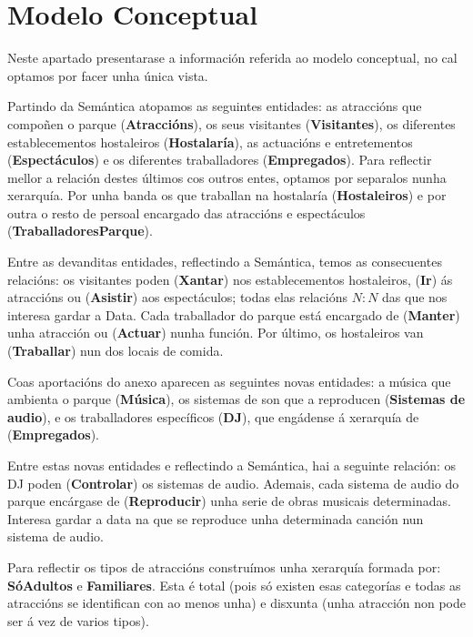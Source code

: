 \documentclass[12pt,a4paper]{book}
\theoremstyle{definition}
\theoremstyle{break}
\begin{document}
	
	
	\chapter{Modelo Conceptual}
	Neste apartado presentarase a información referida ao modelo conceptual, no cal optamos por facer unha única vista.
	
	Partindo da Semántica atopamos as seguintes entidades: as atraccións que compoñen o parque (\textbf{Atraccións}), os seus visitantes (\textbf{Visitantes}), os diferentes establecementos hostaleiros (\textbf{Hostalaría}), as actuacións e entretementos (\textbf{Espectáculos}) e os diferentes traballadores (\textbf{Empregados}). Para reflectir mellor a relación destes últimos cos outros entes, optamos por separalos nunha xerarquía. Por unha banda os que traballan na hostalaría (\textbf{Hostaleiros}) e por outra o resto de persoal encargado das atraccións e espectáculos (\textbf{TraballadoresParque}).
	
	Entre as devanditas entidades, reflectindo a Semántica, temos as consecuentes relacións: os visitantes poden (\textbf{Xantar}) nos establecementos hostaleiros, (\textbf{Ir}) ás atraccións ou (\textbf{Asistir}) aos espectáculos; todas elas relacións $N:N$ das que nos interesa gardar a Data. Cada traballador do parque está encargado de (\textbf{Manter}) unha atracción ou (\textbf{Actuar}) nunha función. Por último, os hostaleiros van (\textbf{Traballar}) nun dos locais de comida.
	
	Coas aportacións do anexo aparecen as seguintes novas entidades: a música que ambienta o
	parque (\textbf{Música}), os sistemas de son que a reproducen (\textbf{Sistemas de audio}),
	e os traballadores específicos (\textbf{DJ}), que engádense á xerarquía de (\textbf{Empregados}).
	
	Entre estas novas entidades e reflectindo a Semántica, hai a seguinte relación: os DJ poden (\textbf{Controlar}) os sistemas de audio. Ademais, cada sistema
	de audio do parque encárgase de (\textbf{Reproducir}) unha serie de obras musicais determinadas. Interesa gardar a data na que se reproduce unha determinada
	canción nun sistema de audio.
	
	Para reflectir os tipos de atraccións construímos unha xerarquía formada por: \textbf{SóAdultos} e
	\textbf{Familiares}. Esta é total (pois só existen esas categorías e todas as atraccións se
	identifican con ao menos unha) e disxunta (unha atracción non pode ser á vez de varios
	tipos).
	
\end{document}

